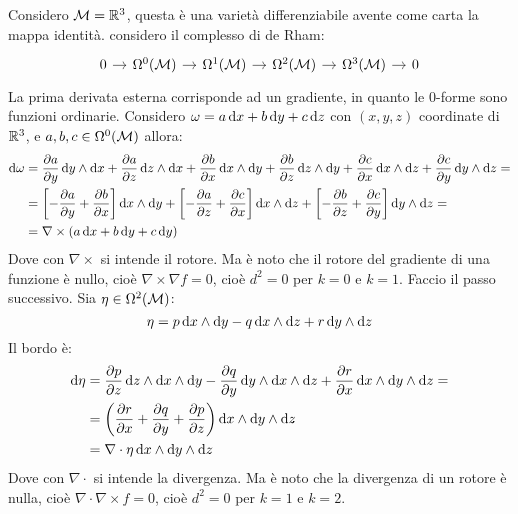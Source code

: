 \begin{example}
  Considero $ \mathcal{M} = \mathbb{R}^{3} $, questa è una varietà differenziabile avente come carta la mappa identità.
  considero il complesso di de Rham:
  \[
    \begin{tikzcd}[nodes = {column sep = 10 pt}]
      0 \rar & \Omega^0(\M) \rar & \Omega^1(\M) \rar & \Omega^2(\M) \rar & \Omega^3(\M) \rar & 0
    \end{tikzcd}
  \]
  La prima derivata esterna corrisponde ad un gradiente, in quanto le $ 0 $-forme sono funzioni ordinarie.
  Considero $ \omega = a \operatorname{d}\!{x} + b \operatorname{d}\!{y} + c \operatorname{d}\!{z} $ con $ (x,y,z) $ coordinate di $ \mathbb{R}^{3} $, e $ a, b, c \in \Omega^0(\mathcal{M}) $
  allora:
  \begin{align*}
    \d \omega & =          \frac{\partial a}{\partial y} \d y \wedge \d x + \frac{\partial a}{\partial z} \d z \wedge \d x + \frac{\partial b}{\partial x} \d x \wedge \d y +
             \frac{\partial b}{\partial z} \d z \wedge \d y + \frac{\partial c}{\partial x} \d x \wedge \d z + \frac{\partial c}{\partial y} \d y \wedge \d z = \\
         & =      \left[ - \frac{\partial a}{\partial y} + \frac{\partial b}{\partial x} \right] \d x \wedge \d y +
                 \left[ - \frac{\partial a}{\partial z} + \frac{\partial c}{\partial x} \right] \d x \wedge \d z +
                 \left[ - \frac{\partial b}{\partial z} + \frac{\partial c}{\partial y} \right] \d y \wedge \d z =                      \\
         & =  \nabla \times (a \d x + b \d y + c \d y)
  \end{align*}
  Dove con $ \nabla \times $ si intende il rotore. Ma è noto che il rotore del gradiente di una funzione è nullo,
  cioè $ \nabla \times \nabla f = 0 $, cioè $ d^2 = 0 $ per $ k = 0 $ e $ k = 1 $.
  Faccio il passo successivo. Sia $ \eta \in \Omega^2(\mathcal{M}) $:
  \[
    \eta = p \operatorname{d}\!{x} \wedge \operatorname{d}\!{y} - q \operatorname{d}\!{x} \wedge \operatorname{d}\!{z} + r \operatorname{d}\!{y} \wedge \operatorname{d}\!{z}
  \]
  Il bordo è:
  \begin{align*}
    \d \eta & = \frac{\partial p}{\partial z} \d z \wedge \d x \wedge \d y - \frac{\partial q}{\partial y} \d y \wedge \d x \wedge \d z + \frac{\partial r}{\partial x} \d x \wedge \d y \wedge \d z = \\
    & = \left( \frac{\partial r}{\partial x} + \frac{\partial q}{\partial y} + \frac{\partial p}{\partial z} \right) \d x \wedge \d y \wedge \d z\\
    & = \nabla \cdot \eta \d x \wedge \d y \wedge \d z
  \end{align*}
  Dove con $ \nabla \cdot $ si intende la divergenza. Ma è noto che la divergenza di un rotore è nulla,
  cioè $ \nabla \cdot \nabla \times f = 0 $, cioè $ d^2 = 0 $ per $ k = 1 $ e $ k = 2 $.
\end{example}



